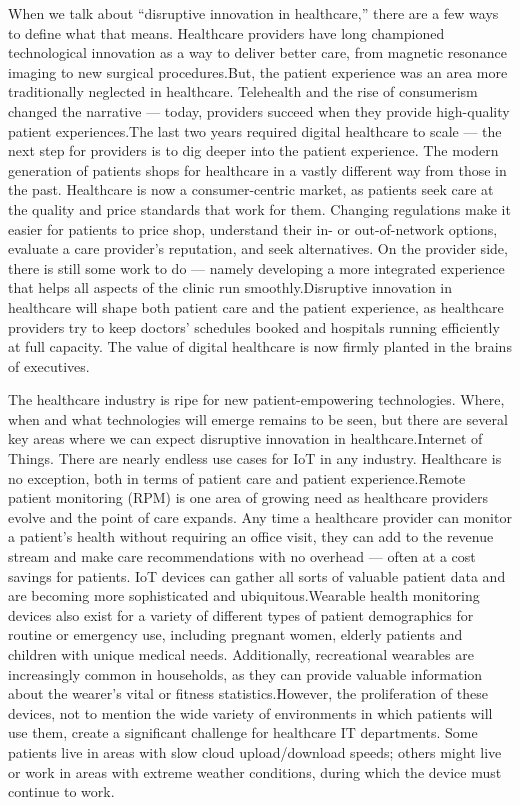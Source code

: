\documentclass[12pt]{article}
\begin{document}
When we talk about “disruptive innovation in healthcare,” there are a few ways to define what that means. Healthcare providers have long championed technological innovation as a way to deliver better care, from magnetic resonance imaging to new surgical procedures.But, the patient experience was an area more traditionally neglected in healthcare. Telehealth and the rise of consumerism changed the narrative — today, providers succeed when they provide high-quality patient experiences.The last two years required digital healthcare to scale — the next step for providers is to dig deeper into the patient experience. The modern generation of patients shops for healthcare in a vastly different way from those in the past. Healthcare is now a consumer-centric market, as patients seek care at the quality and price standards that work for them. Changing regulations make it easier for patients to price shop, understand their in- or out-of-network options, evaluate a care provider’s reputation, and seek alternatives. On the provider side, there is still some work to do — namely developing a more integrated experience that helps all aspects of the clinic run smoothly.Disruptive innovation in healthcare will shape both patient care and the patient experience, as healthcare providers try to keep doctors’ schedules booked and hospitals running efficiently at full capacity. The value of digital healthcare is now firmly planted in the brains of executives.

\indent

The healthcare industry is ripe for new patient-empowering technologies. Where, when and what technologies will emerge remains to be seen, but there are several key areas where we can expect disruptive innovation in healthcare.Internet of Things. There are nearly endless use cases for IoT in any industry. Healthcare is no exception, both in terms of patient care and patient experience.Remote patient monitoring (RPM) is one area of growing need as healthcare providers evolve and the point of care expands. Any time a healthcare provider can monitor a patient’s health without requiring an office visit, they can add to the revenue stream and make care recommendations with no overhead — often at a cost savings for patients. IoT devices can gather all sorts of valuable patient data and are becoming more sophisticated and ubiquitous.Wearable health monitoring devices also exist for a variety of different types of patient demographics for routine or emergency use, including pregnant women, elderly patients and children with unique medical needs. Additionally, recreational wearables are increasingly common in households, as they can provide valuable information about the wearer’s vital or fitness statistics.However, the proliferation of these devices, not to mention the wide variety of environments in which patients will use them, create a significant challenge for healthcare IT departments. Some patients live in areas with slow cloud upload/download speeds; others might live or work in areas with extreme weather conditions, during which the device must continue to work.
\end{document}

